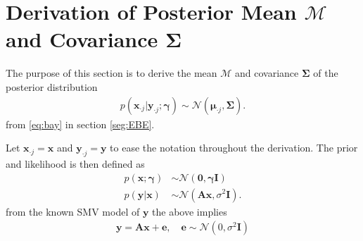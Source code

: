 \section{Derivation of Posterior Mean $\mathcal{M}$ and Covariance $\boldsymbol{\Sigma}$}\label{app_sec:mean_cov}
The purpose of this section is to derive the mean $\mathcal{M}$ and covariance $\boldsymbol{\Sigma}$ of the posterior distribution
\begin{align*}
p\left( \mathbf{x}_{\cdot j} \vert \mathbf{y}_{\cdot j} ; \boldsymbol{\gamma} \right) \sim \mathcal{N}(\boldsymbol{\mu}_{\cdot j} , \boldsymbol{\Sigma}).
\end{align*}
from \eqref{eq:bay} in section \ref{seg:EBE}. 

Let $\mathbf{x}_{\cdot j} = \mathbf{x}$ and $\mathbf{y}_{\cdot j} = \mathbf{y}$ to ease the notation throughout the derivation. The prior and likelihood is then defined as
\begin{align*}
p(\mathbf{x} ; \boldsymbol{\gamma}) &\sim \mathcal{N}(\mathbf{0}, \boldsymbol{\gamma} \mathbf{I} ) \\
p(\mathbf{y} \vert \mathbf{x}) &\sim \mathcal{N}(\mathbf{A}\mathbf{x}, \sigma^2 \mathbf{I}).
\end{align*}
from the known SMV model of $\textbf{y}$ the above implies
\begin{align*}
\textbf{y}=\textbf{A}\textbf{x}+\textbf{e}, \quad \textbf{e}\sim \mathcal{N}(0,\sigma^2\textbf{I}) 
\end{align*}

